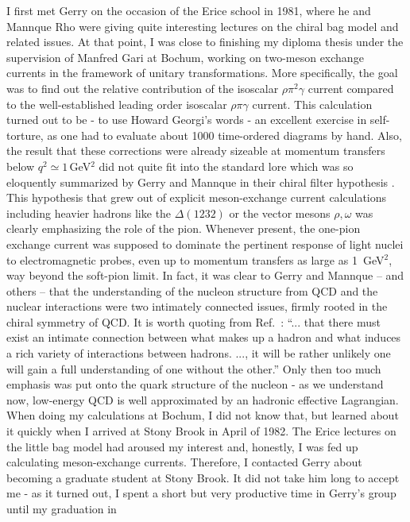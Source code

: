 \documentclass[a4paper,fleqn]{scrartcl}
\begin{document}
I first met Gerry on the occasion of the Erice school in 1981, where he
and Mannque Rho were giving quite interesting lectures on the chiral bag model
and related issues. At that point, I was close to finishing my diploma
thesis under the supervision of Manfred Gari at Bochum, working on two-meson
exchange currents in the framework of unitary transformations. More
specifically, the goal was to find out the relative contribution of the
isoscalar $\rho \pi^2 \gamma$ current compared to the well-established
leading order isoscalar  $\rho \pi \gamma$ current. This calculation turned
out to be - to use Howard Georgi's words - an excellent exercise in
self-torture, as one had to evaluate about 1000 time-ordered diagrams by hand. Also,
the result that these corrections were already sizeable at momentum transfers
below $q^2 \simeq 1\,$GeV$^{2}$ did not quite fit into the standard lore which was
so eloquently summarized by Gerry and Mannque in their chiral filter
hypothesis \cite{Rho:1981zi}. This hypothesis that grew out of explicit
meson-exchange current calculations including heavier hadrons like the
$\Delta(1232)$ or the vector mesons $\rho, \omega$ was clearly emphasizing
the role of the pion. Whenever present, the one-pion exchange current was
supposed to dominate the pertinent response of light nuclei
to electromagnetic probes, even up to momentum transfers as large as
1~GeV$^2$, way beyond the soft-pion limit. 
In fact, it was clear to Gerry and Mannque -- and others --
 that the understanding
of the nucleon structure from QCD and the nuclear interactions were two
intimately connected issues, firmly rooted in the chiral symmetry of
QCD. It is worth quoting from Ref.~\cite{Rho:1981zi}: ``... that there
must exist an intimate connection between what makes up a hadron and
what induces a rich variety of interactions between hadrons. ..., it will 
be rather unlikely one will gain a full understanding of one without the
other.'' Only then too much emphasis was put onto the quark structure of
the nucleon - as we understand now,  low-energy QCD is well approximated
by an hadronic effective Lagrangian. When doing my calculations at Bochum, 
I did not know that, but learned about it quickly when I arrived at 
Stony Brook in April of 1982. The Erice lectures on the little 
bag model had aroused my interest and, honestly, I was fed up
calculating meson-exchange currents. Therefore, I contacted Gerry  
about becoming a graduate student at Stony
Brook. It did not take him long to accept me - as it turned out, I spent
a short but very productive time in Gerry's group until my graduation in
\end{document}
